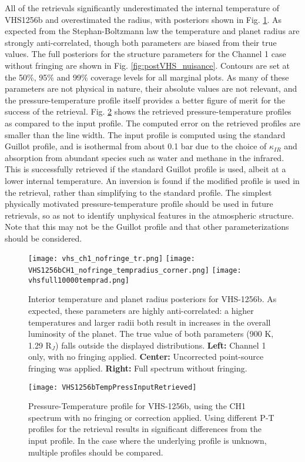 All of the retrievals significantly underestimated the internal temperature of VHS1256b and overestimated the radius, with posteriors shown in Fig. \ref{fig:postVHS_tr}.
As expected from the Stephan-Boltzmann law the temperature and planet radius are strongly anti-correlated, though both parameters are biased from their true values.
The full posteriors for the structure parameters for the Channel 1 case without fringing are shown in Fig. \ref{fig:postVHS_nuisance}.
Contours are set at the 50\%, 95\% and 99\% coverage levels for all marginal plots.
As many of these parameters are not physical in nature, their absolute values are not relevant, and the pressure-temperature profile itself provides a better figure of merit for the success of the retrieval.
Fig. \ref{fig:presVHS} shows the retrieved pressure-temperature profiles as compared to the input profile. 
The computed error on the retrieved profiles are smaller than the line width.
The input profile is computed using the standard Guillot profile, and is isothermal from about 0.1 bar due to the choice of $\kappa_{IR}$ and absorption from abundant species such as water and methane in the infrared.
This is successfully retrieved if the standard Guillot profile is used, albeit at a lower internal temperature.
An inversion is found if the modified profile is used in the retrieval, rather than simplifying to the standard profile.
The simplest physically motivated pressure-temperature profile should be used in future retrievals, so as not to identify unphysical features in the atmospheric structure.
Note that this may not be the Guillot profile and that other parameterizations should be considered.

\begin{figure}[t]
	\centering
	\texttt{[image: vhs\_ch1\_nofringe\_tr.png]}
	\texttt{[image: VHS1256bCH1\_nofringe\_tempradius\_corner.png]}
	\texttt{[image: vhsfull10000temprad.png]}
	\caption{Interior temperature and planet radius posteriors for VHS-1256b.
		As expected, these parameters are highly anti-correlated: a higher temperatures and larger radii both result in increases in the overall luminosity of the planet. The true value of both parameters (900 K, 1.29 R$_{J}$) falls outside the displayed distributions.
		\textbf{Left:} Channel 1 only, with no fringing applied. 
		\textbf{Center:} Uncorrected point-source fringing was applied. 
		\textbf{Right:} Full spectrum without fringing. }
	\label{fig:postVHS_tr}
\end{figure}
\begin{figure}
	\centering
	\texttt{[image: VHS1256bTempPressInputRetrieved]}
	\caption{Pressure-Temperature profile for VHS-1256b, using the CH1 spectrum with no fringing or correction applied. Using different P-T profiles for the retrieval results in significant differences from the input profile. In the case where the underlying profile is unknown, multiple profiles should be compared.}
	\label{fig:presVHS}
\end{figure}

